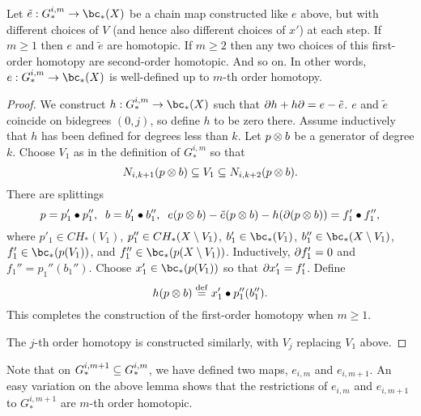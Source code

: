 
\begin{lemma} \label{m_order_hty}
Let $\tilde{e} :  G_*^{i,m} \to \bc_*(X)$ be a chain map constructed like $e$ above, but with
different choices of $V$ (and hence also different choices of $x'$) at each step.
If $m \ge 1$ then $e$ and $\tilde{e}$ are homotopic.
If $m \ge 2$ then any two choices of this first-order homotopy are second-order homotopic.
And so on.
In other words,  $e :  G_*^{i,m} \to \bc_*(X)$ is well-defined up to $m$-th order homotopy.
\end{lemma}

\begin{proof}
We construct $h: G_*^{i,m} \to \bc_*(X)$ such that $\partial h + h\partial = e - \tilde{e}$.
$e$ and $\tilde{e}$ coincide on bidegrees $(0, j)$, so define $h$
to be zero there.
Assume inductively that $h$ has been defined for degrees less than $k$.
Let $p\otimes b$ be a generator of degree $k$.
Choose $V_1$ as in the definition of $G_*^{i,m}$ so that
\[
	N_{i,k+1}(p\otimes b) \subseteq V_1 \subseteq N_{i,k+2}(p\otimes b) .
\]
There are splittings
\[
	p = p'_1\bullet p''_1 , \;\; b = b'_1\bullet b''_1 , 
			\;\; e(p\otimes b) - \tilde{e}(p\otimes b) - h(\partial(p\otimes b)) = f'_1\bullet f''_1 ,
\]
where $p'_1 \in CH_*(V_1)$, $p''_1 \in CH_*(X\setminus V_1)$, 
$b'_1 \in \bc_*(V_1)$, $b''_1 \in \bc_*(X\setmin V_1)$, 
$f'_1 \in \bc_*(p(V_1))$, and $f''_1 \in \bc_*(p(X\setmin V_1))$.
Inductively, $\partial f'_1 = 0$ and $f_1'' = p_1''(b_1'')$.
Choose $x'_1 \in \bc_*(p(V_1))$ so that $\partial x'_1 = f'_1$.
Define 
\[
	h(p\otimes b) \stackrel{\mathrm{def}}{=} x'_1 \bullet p''_1(b''_1) .
\]
This completes the construction of the first-order homotopy when $m \ge 1$.

The $j$-th order homotopy is constructed similarly, with $V_j$ replacing $V_1$ above.
\end{proof}

Note that on $G_*^{i,m+1} \subseteq G_*^{i,m}$, we have defined two maps,
$e_{i,m}$ and $e_{i,m+1}$.
An easy variation on the above lemma shows that 
the restrictions of $e_{i,m}$ and $e_{i,m+1}$ to $G_*^{i,m+1}$ are $m$-th 
order homotopic.

